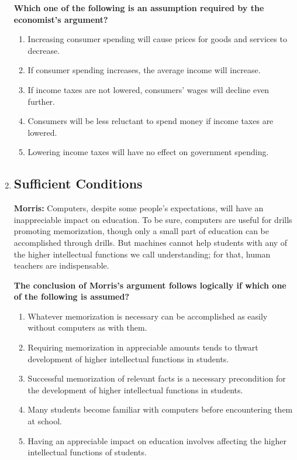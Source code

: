 \documentclass[9pt]{article}
\begin{document}
\begin{multicols}{2}
\begin{enumerate}
 

\noindent
\textbf{Which one of the following is an assumption required by the economist’s argument?}

\begin{enumerate}[label=(\alph*)]
    \item Increasing consumer spending will cause prices for goods and services to decrease.
    \item If consumer spending increases, the average income will increase.
    \item If income taxes are not lowered, consumers' wages will decline even further.
    \item Consumers will be less reluctant to spend money if income taxes are lowered.
    \item Lowering income taxes will have no effect on government spending.
\end{enumerate}

\item
\subsection*{Sufficient Conditions}
\noindent
\textbf{Morris:} Computers, despite some people's expectations, will have an inappreciable impact on education. To be sure, computers are useful for drills promoting memorization, though only a small part of education can be accomplished through drills. But machines cannot help students with any of the higher intellectual functions we call understanding; for that, human teachers are indispensable.

 

\noindent
\textbf{The conclusion of Morris's argument follows logically if which one of the following is assumed?}

\begin{enumerate}[label=(\alph*)]
    \item Whatever memorization is necessary can be accomplished as easily without computers as with them.
    \item Requiring memorization in appreciable amounts tends to thwart development of higher intellectual functions in students.
    \item Successful memorization of relevant facts is a necessary precondition for the development of higher intellectual functions in students.
    \item Many students become familiar with computers before encountering them at school.
    \item Having an appreciable impact on education involves affecting the higher intellectual functions of students.
\end{enumerate}
\end{enumerate}
\end{multicols}
\end{document}
